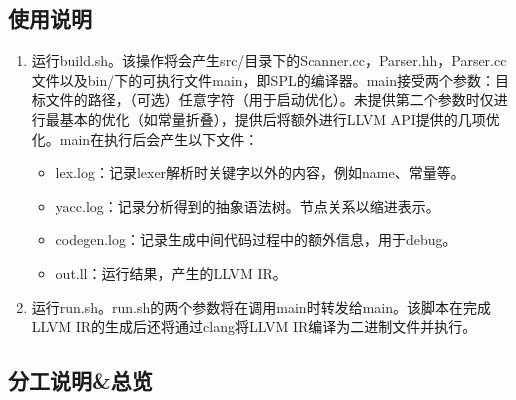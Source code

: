 \documentclass{article}
\begin{document}
\subsection*{使用说明}
\begin{enumerate}
  \item 运行build.sh。该操作将会产生src/目录下的Scanner.cc，Parser.hh，Parser.cc文件以及bin/下的可执行文件main，即SPL的编译器。main接受两个参数：目标文件的路径，（可选）任意字符（用于启动优化）。未提供第二个参数时仅进行最基本的优化（如常量折叠），提供后将额外进行LLVM API提供的几项优化。main在执行后会产生以下文件：
    \begin{itemize}
      \item lex.log：记录lexer解析时关键字以外的内容，例如name、常量等。
      \item yacc.log：记录分析得到的抽象语法树。节点关系以缩进表示。
      \item codegen.log：记录生成中间代码过程中的额外信息，用于debug。
      \item out.ll：运行结果，产生的LLVM IR。
    \end{itemize}
  \item 运行run.sh。run.sh的两个参数将在调用main时转发给main。该脚本在完成LLVM IR的生成后还将通过clang将LLVM IR编译为二进制文件并执行。
\end{enumerate}

\subsection*{分工说明\&总览}
\end{document}
